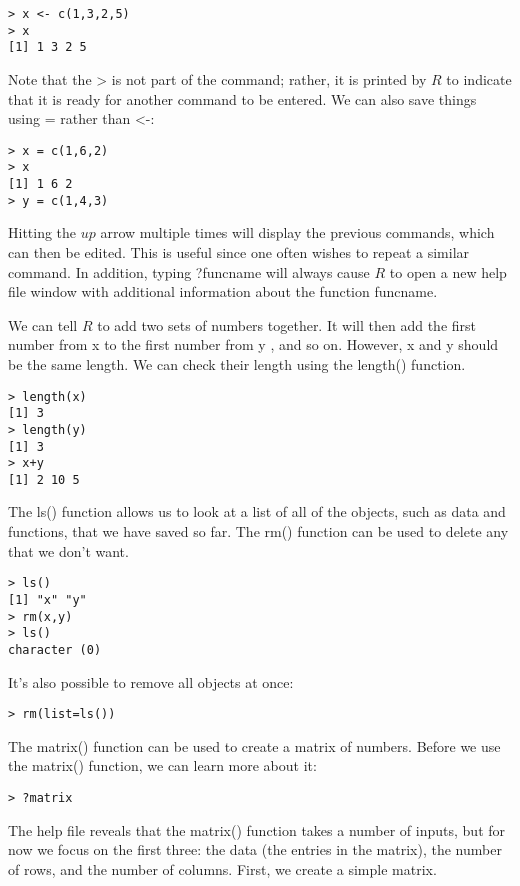 \documentclass[10pt]{article}
\begin{document}
\begin{verbatim}
> x <- c(1,3,2,5)
> x
[1] 1 3 2 5
\end{verbatim}

Note that the > is not part of the command; rather, it is printed by $R$ to indicate that it is ready for another command to be entered. We can also save things using = rather than <-:

\begin{verbatim}
> x = c(1,6,2)
> x
[1] 1 6 2
> y = c(1,4,3)
\end{verbatim}

Hitting the $u p$ arrow multiple times will display the previous commands, which can then be edited. This is useful since one often wishes to repeat a similar command. In addition, typing ?funcname will always cause $R$ to open a new help file window with additional information about the function funcname.

We can tell $R$ to add two sets of numbers together. It will then add the first number from x to the first number from y , and so on. However, x and y should be the same length. We can check their length using the length() function.

\begin{verbatim}
> length(x)
[1] 3
> length(y)
[1] 3
> x+y
[1] 2 10 5
\end{verbatim}

The ls() function allows us to look at a list of all of the objects, such as data and functions, that we have saved so far. The rm() function can be used to delete any that we don't want.

\begin{verbatim}
> ls()
[1] "x" "y"
> rm(x,y)
> ls()
character (0)
\end{verbatim}

It's also possible to remove all objects at once:

\begin{verbatim}
> rm(list=ls())
\end{verbatim}

The matrix() function can be used to create a matrix of numbers. Before we use the matrix() function, we can learn more about it:

\begin{verbatim}
> ?matrix
\end{verbatim}

The help file reveals that the matrix() function takes a number of inputs, but for now we focus on the first three: the data (the entries in the matrix), the number of rows, and the number of columns. First, we create a simple matrix.
\end{document}
